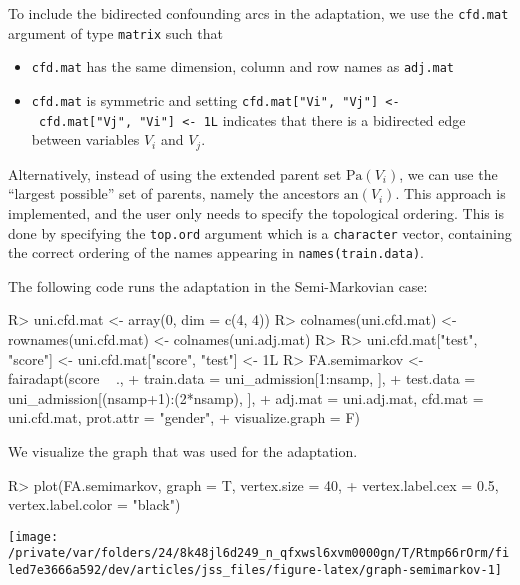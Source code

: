 \documentclass[
  notitle]{jss}
\providecommand{\tightlist}{%
  \setlength{\itemsep}{0pt}\setlength{\parskip}{0pt}}
\begin{document}
To include the bidirected confounding arcs in the adaptation, we use the
\texttt{cfd.mat} argument of type \texttt{matrix} such that

\begin{itemize}
\tightlist
\item
  \texttt{cfd.mat} has the same dimension, column and row names as
  \texttt{adj.mat}
\item
  \texttt{cfd.mat} is symmetric and setting
  \texttt{cfd.mat{[}"Vi",\ "Vj"{]}\ \textless{}-\ cfd.mat{[}"Vj",\ "Vi"{]}\ \textless{}-\ 1L}
  indicates that there is a bidirected edge between variables \(V_i\)
  and \(V_j\).
\end{itemize}

Alternatively, instead of using the extended parent set
\(\mathrm{Pa}(V_i)\), we can use the ``largest possible'' set of
parents, namely the ancestors \(\mathrm{an}(V_i)\). This approach is
implemented, and the user only needs to specify the topological
ordering. This is done by specifying the \texttt{top.ord} argument which
is a \texttt{character} vector, containing the correct ordering of the
names appearing in \texttt{names(train.data)}.

The following code runs the adaptation in the Semi-Markovian case:

\begin{CodeChunk}
\begin{CodeInput}
R> uni.cfd.mat <- array(0, dim = c(4, 4))
R> colnames(uni.cfd.mat) <- rownames(uni.cfd.mat) <- colnames(uni.adj.mat)
R> 
R> uni.cfd.mat["test", "score"] <- uni.cfd.mat["score", "test"] <- 1L
R> FA.semimarkov <- fairadapt(score ~ .,
+   train.data = uni_admission[1:nsamp, ],
+   test.data = uni_admission[(nsamp+1):(2*nsamp), ],
+   adj.mat = uni.adj.mat, cfd.mat = uni.cfd.mat, prot.attr = "gender",
+   visualize.graph = F)
\end{CodeInput}
\end{CodeChunk}

We visualize the graph that was used for the adaptation.

\begin{CodeChunk}
\begin{CodeInput}
R> plot(FA.semimarkov, graph = T, vertex.size = 40,
+   vertex.label.cex = 0.5, vertex.label.color = "black")
\end{CodeInput}


\begin{center}\texttt{[image: /private/var/folders/24/8k48jl6d249\_n\_qfxwsl6xvm0000gn/T/Rtmp66rOrm/filed7e3666a592/dev/articles/jss\_files/figure-latex/graph-semimarkov-1]} \end{center}

\end{CodeChunk}
\end{document}
